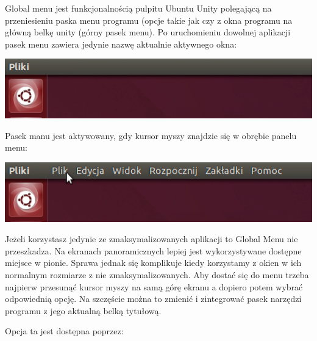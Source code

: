 Global menu jest funkcjonalnością pulpitu Ubuntu Unity polegającą na przeniesieniu paska menu programu (opcje takie jak   czy  z okna programu na główną belkę unity (górny pasek menu). Po uruchomieniu dowolnej aplikacji pasek menu zawiera jedynie nazwę aktualnie aktywnego okna:

\begin{center}
	\includegraphics[width=\linewidth]{images/unity_menu_bar2.png}
\end{center}

Pasek manu jest aktywowany, gdy kursor myszy znajdzie się w obrębie panelu menu:

\begin{center}
	\includegraphics[width=\linewidth]{images/unity_menu_bar3.png}
\end{center}

Jeżeli korzystasz jedynie ze zmaksymalizowanych aplikacji to Global Menu nie przeszkadza. Na ekranach panoramicznych lepiej jest wykorzystywane dostępne miejsce w pionie. Sprawa jednak się komplikuje kiedy korzystamy z okien w ich normalnym rozmiarze z nie zmaksymalizowanych. Aby dostać się do menu trzeba najpierw przesunąć kursor myszy na samą górę ekranu a dopiero potem wybrać odpowiednią opcję. Na szczęście można to zmienić i zintegrować pasek narzędzi programu z jego aktualną belką tytułową. 

Opcja ta jest dostępna poprzez:
\noindent {}